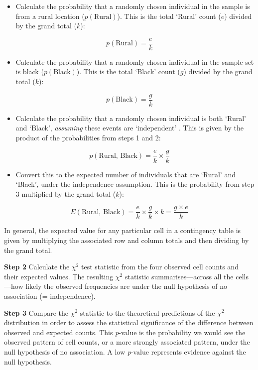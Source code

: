 \documentclass[
]{book}
\providecommand{\tightlist}{%
  \setlength{\itemsep}{0pt}\setlength{\parskip}{0pt}}
\begin{document}
\begin{itemize}
\tightlist
\item
  Calculate the probability that a randomly chosen individual in the sample is from a rural location (\(p(\text{Rural})\)). This is the total `Rural' count (\(e\)) divided by the grand total (\(k\)):
\end{itemize}

\[p(\text{Rural}) = \frac{e}{k}\]

\begin{itemize}
\tightlist
\item
  Calculate the probability that a randomly chosen individual in the sample set is black (\(p(\text{Black})\)). This is the total `Black' count (\(g\)) divided by the grand total (\(k\)):
\end{itemize}

\[p(\text{Black}) = \frac{g}{k}\]

\begin{itemize}
\tightlist
\item
  Calculate the probability that a randomly chosen individual is both `Rural' and `Black', \emph{assuming} these events are `independent' . This is given by the product of the probabilities from steps 1 and 2:
\end{itemize}

\[p(\text{Rural, Black}) = \frac{e}{k} \times \frac{g}{k}\]

\begin{itemize}
\tightlist
\item
  Convert this to the expected number of individuals that are `Rural' and `Black', under the independence assumption. This is the probability from step 3 multiplied by the grand total (\(k\)):
\end{itemize}

\[E(\text{Rural, Black}) = \frac{e}{k} \times \frac{g}{k} \times {k} = \frac{g \times e}{k}\]

In general, the expected value for any particular cell in a contingency table is given by multiplying the associated row and column totals and then dividing by the grand total.

\textbf{Step 2} Calculate the \(\chi^{2}\) test statistic from the four observed cell counts and their expected values. The resulting \(\chi^{2}\) statistic summarises---across all the cells---how likely the observed frequencies are under the null hypothesis of no association (= independence).

\textbf{Step 3} Compare the \(\chi^{2}\) statistic to the theoretical predictions of the \(\chi^{2}\) distribution in order to assess the statistical significance of the difference between observed and expected counts. This \emph{p}-value is the probability we would see the observed pattern of cell counts, or a more strongly associated pattern, under the null hypothesis of no association. A low \emph{p}-value represents evidence against the null hypothesis.
\end{document}
